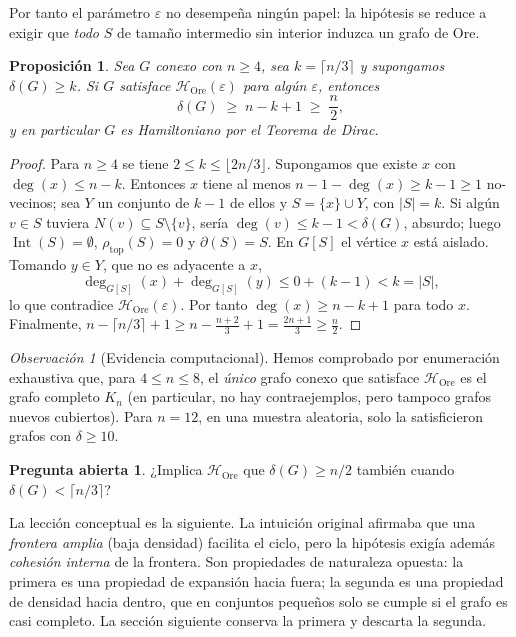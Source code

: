 \documentclass[11pt,a4paper]{article}
\newtheorem{proposicion}[teorema]{Proposición}
\theoremstyle{definition}
\newtheorem{pregunta}[teorema]{Pregunta abierta}
\theoremstyle{remark}
\newtheorem{observacion}[teorema]{Observación}
\newcommand{\Int}{\operatorname{Int}}
\newcommand{\rtop}{\rho_{\mathrm{top}}}
\begin{document}
Por tanto el parámetro $\varepsilon$ no desempeña ningún papel: la hipótesis se reduce a exigir que \emph{todo} $S$ de tamaño intermedio sin interior induzca un grafo de Ore.

\begin{proposicion}\label{prop:colapso}
Sea $G$ conexo con $n\ge4$, sea $k=\lceil n/3\rceil$ y supongamos $\delta(G)\ge k$. Si $G$ satisface $\mathcal{H}_{\mathrm{Ore}}(\varepsilon)$ para algún $\varepsilon$, entonces
\[
\delta(G)\;\ge\;n-k+1\;\ge\;\frac n2,
\]
y en particular $G$ es Hamiltoniano por el Teorema de Dirac.
\end{proposicion}

\begin{proof}
Para $n\ge4$ se tiene $2\le k\le\lfloor 2n/3\rfloor$. Supongamos que existe $x$ con $\deg(x)\le n-k$. Entonces $x$ tiene al menos $n-1-\deg(x)\ge k-1\ge1$ no-vecinos; sea $Y$ un conjunto de $k-1$ de ellos y $S=\{x\}\cup Y$, con $|S|=k$.
Si algún $v\in S$ tuviera $N(v)\subseteq S\setminus\{v\}$, sería $\deg(v)\le k-1<\delta(G)$, absurdo; luego $\Int(S)=\emptyset$, $\rtop(S)=0$ y $\partial(S)=S$.
En $G[S]$ el vértice $x$ está aislado. Tomando $y\in Y$, que no es adyacente a $x$,
\[
\deg_{G[S]}(x)+\deg_{G[S]}(y)\le 0+(k-1)<k=|S|,
\]
lo que contradice $\mathcal{H}_{\mathrm{Ore}}(\varepsilon)$. Por tanto $\deg(x)\ge n-k+1$ para todo $x$. Finalmente, $n-\lceil n/3\rceil+1\ge n-\frac{n+2}{3}+1=\frac{2n+1}{3}\ge\frac n2$.
\end{proof}

\begin{observacion}[Evidencia computacional]
Hemos comprobado por enumeración exhaustiva que, para $4\le n\le 8$, el \emph{único} grafo conexo que satisface $\mathcal{H}_{\mathrm{Ore}}$ es el grafo completo $K_n$ (en particular, no hay contraejemplos, pero tampoco grafos nuevos cubiertos). Para $n=12$, en una muestra aleatoria, solo la satisficieron grafos con $\delta\ge10$.
\end{observacion}

\begin{pregunta}
¿Implica $\mathcal{H}_{\mathrm{Ore}}$ que $\delta(G)\ge n/2$ también cuando $\delta(G)<\lceil n/3\rceil$?
\end{pregunta}

La lección conceptual es la siguiente. La intuición original afirmaba que una \emph{frontera amplia} (baja densidad) facilita el ciclo, pero la hipótesis exigía además \emph{cohesión interna} de la frontera. Son propiedades de naturaleza opuesta: la primera es una propiedad de expansión hacia fuera; la segunda es una propiedad de densidad hacia dentro, que en conjuntos pequeños solo se cumple si el grafo es casi completo. La sección siguiente conserva la primera y descarta la segunda.
\end{document}
